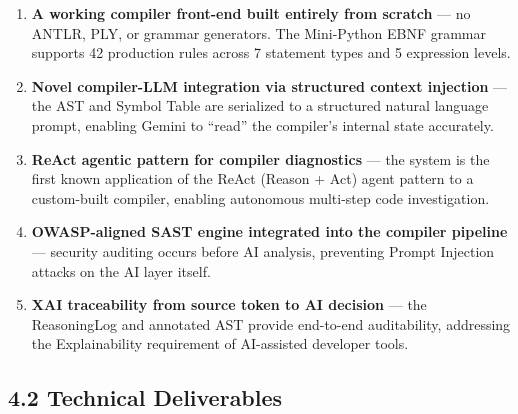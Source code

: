 \documentclass[a4paper,11pt]{article}
\begin{document}
\begin{enumerate}
    \item \textbf{A working compiler front-end built entirely from scratch} --- no ANTLR, PLY, or grammar generators. The Mini-Python EBNF grammar supports 42 production rules across 7 statement types and 5 expression levels.
    \item \textbf{Novel compiler-LLM integration via structured context injection} --- the AST and Symbol Table are serialized to a structured natural language prompt, enabling Gemini to ``read'' the compiler's internal state accurately.
    \item \textbf{ReAct agentic pattern for compiler diagnostics} --- the system is the first known application of the ReAct (Reason + Act) agent pattern to a custom-built compiler, enabling autonomous multi-step code investigation.
    \item \textbf{OWASP-aligned SAST engine integrated into the compiler pipeline} --- security auditing occurs before AI analysis, preventing Prompt Injection attacks on the AI layer itself.
    \item \textbf{XAI traceability from source token to AI decision} --- the ReasoningLog and annotated AST provide end-to-end auditability, addressing the Explainability requirement of AI-assisted developer tools.
\end{enumerate}

\subsection{4.2 Technical Deliverables}
\end{document}
